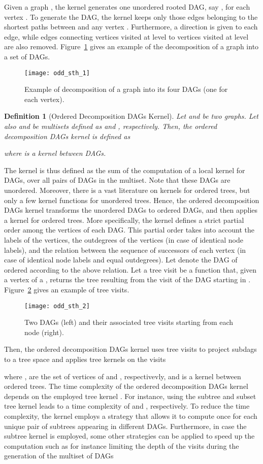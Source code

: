 \documentclass[twoside,11pt]{article}
\newtheorem{definition}{Definition}
\begin{document}
Given a graph , the kernel generates one unordered rooted DAG, say , for each vertex .
To generate the DAG, the kernel keeps only those edges belonging to the shortest paths between  and any vertex .
Furthermore, a direction is given to each edge, while edges connecting vertices visited at level  to vertices visited at level  are also removed.
Figure~\ref{fig:odd_1} gives an example of the decomposition of a graph into a set of DAGs.
\begin{figure}[t]
  \centering
  \texttt{[image: odd\_sth\_1]}
  \caption{Example of decomposition of a graph into its four DAGs (one for each vertex).}
  \label{fig:odd_1}
\end{figure}
\begin{definition}[Ordered Decomposition DAGs Kernel]
  Let  and  be two graphs.
  Let also  and  be multisets defined as  and , respectively.
  Then, the ordered decomposition DAGs kernel is defined as
  
  where  is a kernel between DAGs.
\end{definition}
The kernel is thus defined as the sum of the computation of a local kernel for DAGs, over all pairs of DAGs in the multiset. 
Note that these DAGs are unordered.
Moreover, there is a vast literature on kernels for ordered trees, but only a few kernel functions for unordered trees.
Hence, the ordered decomposition DAGs kernel transforms the unordered DAGs to ordered DAGs, and then applies a kernel for ordered trees.
More specifically, the kernel defines a strict partial order among the vertices of each DAG.
This partial order takes into account the labels of the vertices, the outdegrees of the vertices (in case of identical node labels), and the relation between the sequence of successors of each vertex (in case of identical node labels and equal outdegrees).
Let  denote the DAG of  ordered according to the above relation.
Let a tree visit be a function  that, given a vertex  of a , returns the tree resulting from the visit of the DAG starting in .
Figure~\ref{fig:odd_2} gives an example of tree visits.
\begin{figure}[t]
  \centering
  \texttt{[image: odd\_sth\_2]}
  \caption{Two DAGs (left) and their associated tree visits  starting from each node  (right).}
  \label{fig:odd_2}
\end{figure}
Then, the ordered decomposition DAGs kernel uses tree visits to project subdags to a tree space and applies tree kernels on the visits

where ,  are the set of vertices of  and , respectivevly, and  is a kernel between ordered trees.
The time complexity of the ordered decomposition DAGs kernel depends on the employed tree kernel .
For instance, using the subtree and subset tree kernel leads to a time complexity of  and , respectively.
To reduce the time complexity, the kernel employs a strategy that allows it to compute  once for each unique pair of subtrees appearing in different DAGs.
Furthermore, in case the subtree kernel is employed, some other strategies can be applied to speed up the computation such as for instance limiting the depth of the visits during the generation of the multiset of DAGs 
\end{document}
